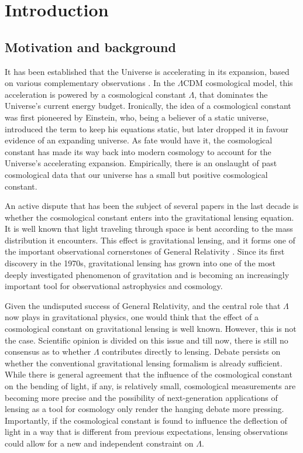 \chapter{Introduction}


\section{Motivation and background}

It has been established that the Universe is accelerating in its expansion, based on various complementary observations \citep{riess2004type,spergel2003first}. In the $\Lambda \text{CDM}$ cosmological model, this acceleration is powered by a cosmological constant $\Lambda$, that dominates the Universe's current energy budget. Ironically, the idea of a cosmological constant was first pioneered by Einstein, who, being a believer of a static universe, introduced the term to keep his equations static, but later dropped it in favour evidence of an expanding universe. As fate would have it, the cosmological constant has made its way back into modern cosmology to account for the Universe's accelerating expansion. Empirically, there is an onslaught of past cosmological data \citet{carmeli2001value,de2000flat,peebles2003cosmological} that our universe has a small but positive cosmological constant. 

An active dispute that has been the subject of several papers in the last decade is whether the cosmological constant enters into the gravitational lensing equation. It is well known that light traveling through space is bent according to the mass distribution it encounters. This effect is gravitational lensing, and it forms one of the important observational cornerstones of General Relativity \citep{will1993theory}. Since its first discovery in the 1970s, gravitational lensing has grown into one of the most deeply investigated phenomenon of gravitation and is becoming an increasingly important tool for observational astrophysics and cosmology. 

Given the undisputed success of General Relativity, and the central role that $\Lambda$ now plays in gravitational physics, one would think that the effect of a cosmological constant on gravitational lensing is well known. However, this is not the case. Scientific opinion is divided on this issue and till now, there is still no consensus as to whether $\Lambda$ contributes directly to lensing. Debate persists on whether the conventional gravitational lensing formalism is already sufficient. While there is general agreement that the influence of the cosmological constant on the bending of light, if any, is relatively small, cosmological measurements are becoming more precise and the possibility of next-generation applications of lensing as a tool for cosmology only render the hanging debate more pressing. Importantly, if the cosmological constant is found to influence the deflection of light in a way that is different from previous expectations, lensing observations could allow for a new and independent constraint on $\Lambda$. 

